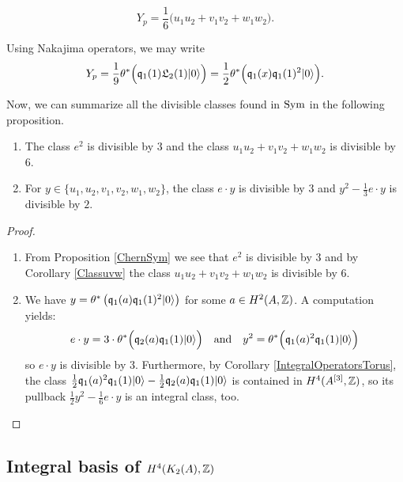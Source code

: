 \begin{corollary}\label{Classuvw}
\begin{equation} \label{YSym}
Y_p =  \frac{1}{6}\Big(u_1u_2 + v_1v_2 +  w_1 w_2 \Big).
\end{equation}
\end{corollary}
\begin{remark}\label{afterClassuvw}
Using Nakajima operators, we may write
\begin{gather}
Y_p = \frac{1}{9} \theta^*\Big( \mathfrak{q}_1(1)\mathfrak L_2(1) |0\rangle \Big) =  \frac{1}{2}\theta^*\Big(\mathfrak{q}_1(x)\mathfrak{q}_1(1)^2|0\rangle\Big).
\end{gather}
\end{remark}
Now, we can summarize all the divisible classes found in $\operatorname{Sym}$ in the following proposition. 
\begin{proposition}\label{classedivisibleSym}
\begin{enumerate}
\item
The class $e^2$ is divisible by $3$ and the class $u_1u_2 + v_1v_2+w_1w_2$ is divisible by 6.
\item
For $y\in\{u_1,u_2,v_1,v_2,w_1,w_2\}$, the class 
$
e \cdot y
$
is divisible by $3$ and 
$
 y^2 - \frac{1}{3} e\cdot y
$
is divisible by $2$.
\end{enumerate}
\end{proposition}
\begin{proof}
\begin{enumerate}
\item
From Proposition \ref{ChernSym} we see that
$e^2$ is divisible by $3$ and by Corollary \ref{Classuvw}
the class $u_1u_2 + v_1v_2+w_1w_2$ is divisible by 6.
\item
We have $y= \theta^*\left(\mathfrak{q}_1(a)\mathfrak{q}_1(1)^2|0\rangle\right)$ for some $a\in H^2(A,\mathbb{Z})$. A computation yields:
$$
e\cdot y = 3\cdot \theta^*\Big( \mathfrak{q}_2(a)\mathfrak{q}_1(1)|0\rangle \Big)
\quad \text{and}\quad
y^2 = \theta^*\Big(\mathfrak{q}_1(a)^2\mathfrak{q}_1(1)|0\rangle\Big)
$$
so $e\cdot y$ is divisible by $3$. Furthermore, by Corollary \ref{IntegralOperatorsTorus}, the class 
$
\frac{1}{2} \mathfrak{q}_1(a)^2\mathfrak{q}_1(1)|0\rangle - \frac{1}{2} \mathfrak{q}_2(a)\mathfrak{q}_1(1)|0\rangle 
$
is contained in $H^4(A^{[3]},\mathbb{Z})$, so its pullback
$
 \frac{1}{2}y^2 - \frac{1}{6} e\cdot y
$
is an integral class, too.
\end{enumerate}
\end{proof}
\subsection{Integral basis of $H^4(K_2(A),\mathbb{Z})$}\label{integralbasisH4}

